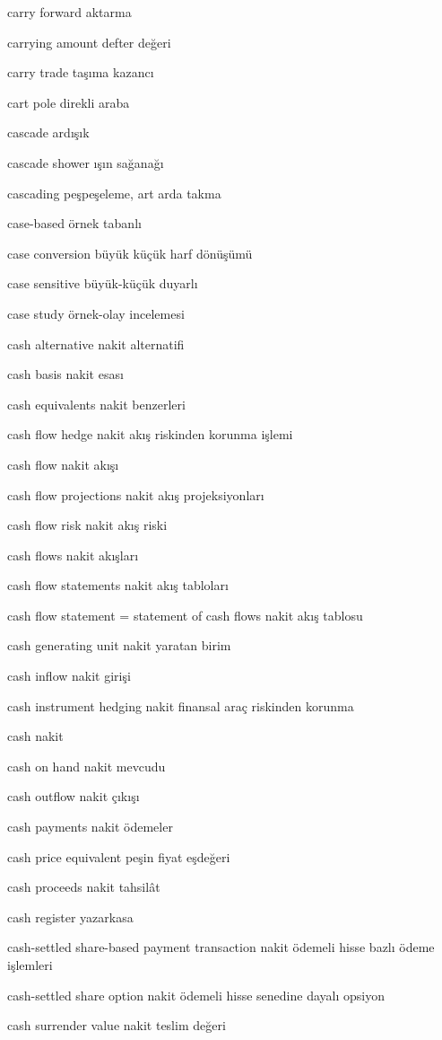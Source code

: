 \documentclass[12pt,fleqn]{article}\usepackage{../../common}
\begin{document}
carry forward aktarma

carrying amount defter değeri

carry trade taşıma kazancı

cart pole direkli araba

cascade ardışık

cascade shower ışın sağanağı

cascading peşpeşeleme, art arda takma

case-based örnek tabanlı

case conversion büyük küçük harf dönüşümü

case sensitive büyük-küçük duyarlı

case study örnek-olay incelemesi

cash alternative nakit alternatifi

cash basis nakit esası

cash equivalents nakit benzerleri

cash flow hedge nakit akış riskinden korunma işlemi

cash flow nakit akışı

cash flow projections nakit akış projeksiyonları

cash flow risk nakit akış riski

cash flows nakit akışları

cash flow statements nakit akış tabloları

cash flow statement = statement of cash flows nakit akış tablosu

cash generating unit nakit yaratan birim

cash inflow nakit girişi

cash instrument hedging nakit finansal araç riskinden korunma

cash nakit

cash on hand nakit mevcudu

cash outflow nakit çıkışı

cash payments nakit ödemeler

cash price equivalent peşin fiyat eşdeğeri

cash proceeds nakit tahsilât

cash register yazarkasa

cash-settled share-based payment transaction nakit ödemeli hisse bazlı ödeme işlemleri

cash-settled share option nakit ödemeli hisse senedine dayalı opsiyon

cash surrender value nakit teslim değeri
\end{document}
